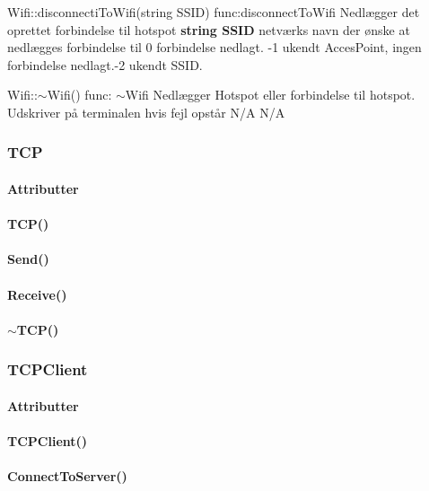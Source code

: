 \begin{functionDescription}
{Wifi::disconnectiToWifi(string SSID)}
{func:disconnectToWifi}
{Nedlægger det oprettet forbindelse til hotspot}
{\textbf{string SSID} netværks navn der ønske at nedlægges forbindelse til}
{0 forbindelse nedlagt. -1 ukendt AccesPoint, ingen forbindelse nedlagt.-2 ukendt SSID.}
\end{functionDescription}

\begin{functionDescription}
{Wifi::$\sim$Wifi()}
{func: $\sim$Wifi}
{Nedlægger Hotspot eller forbindelse til hotspot. Udskriver på terminalen hvis fejl opstår}
{N/A}
{N/A}
\end{functionDescription}

\subsubsection{TCP}
\paragraph{Attributter}
\paragraph{TCP()}
\paragraph{Send()}
\paragraph{Receive()}
\paragraph{$\sim$TCP()}


\subsubsection{TCPClient}
\paragraph{Attributter}
\paragraph{TCPClient()}
\paragraph{ConnectToServer()}
